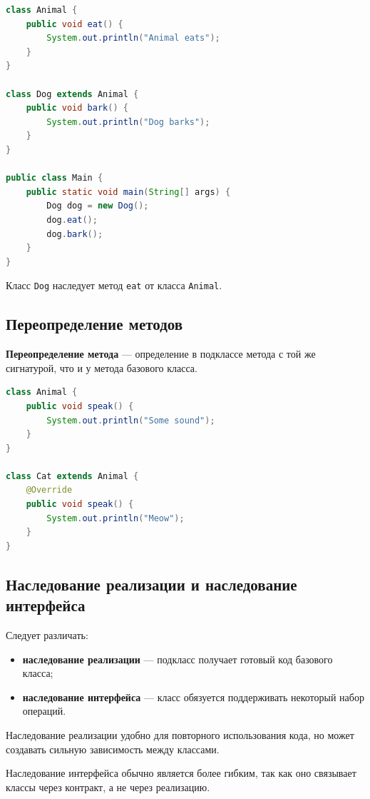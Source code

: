 \documentclass[12pt,a4paper]{article}
\begin{document}
\begin{lstlisting}[language=Java,caption={Наследование}]
class Animal {
    public void eat() {
        System.out.println("Animal eats");
    }
}

class Dog extends Animal {
    public void bark() {
        System.out.println("Dog barks");
    }
}

public class Main {
    public static void main(String[] args) {
        Dog dog = new Dog();
        dog.eat();
        dog.bark();
    }
}
\end{lstlisting}

Класс \texttt{Dog} наследует метод \texttt{eat} от класса \texttt{Animal}.

\subsection{Переопределение методов}

\textbf{Переопределение метода} --- определение в подклассе метода с той же сигнатурой, что и у метода базового класса.

\begin{lstlisting}[language=Java,caption={Переопределение метода}]
class Animal {
    public void speak() {
        System.out.println("Some sound");
    }
}

class Cat extends Animal {
    @Override
    public void speak() {
        System.out.println("Meow");
    }
}
\end{lstlisting}

\subsection{Наследование реализации и наследование интерфейса}

Следует различать:
\begin{itemize}
    \item \textbf{наследование реализации} --- подкласс получает готовый код базового класса;
    \item \textbf{наследование интерфейса} --- класс обязуется поддерживать некоторый набор операций.
\end{itemize}

Наследование реализации удобно для повторного использования кода, но может создавать сильную зависимость между классами.

Наследование интерфейса обычно является более гибким, так как оно связывает классы через контракт, а не через реализацию.
\end{document}
